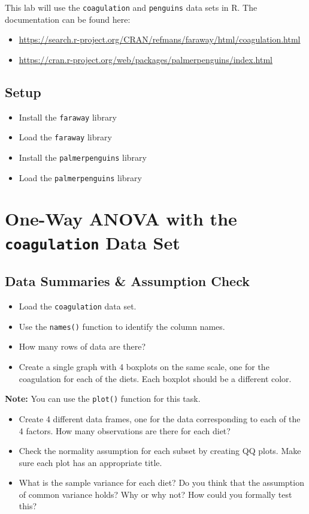 \documentclass{article}
\begin{document}
This lab will use the \texttt{coagulation} and \texttt{penguins} data sets in R. The documentation can be found here:

\begin{itemize}
    \item \url{https://search.r-project.org/CRAN/refmans/faraway/html/coagulation.html}
    \item \url{https://cran.r-project.org/web/packages/palmerpenguins/index.html}
\end{itemize}

\subsection*{Setup}

\begin{itemize}
    \item Install the \texttt{faraway} library
    \item Load the \texttt{faraway} library
    \item Install the \texttt{palmerpenguins} library
    \item Load the \texttt{palmerpenguins} library
\end{itemize}

\section*{One-Way ANOVA with the \texttt{coagulation} Data Set}

\subsection*{Data Summaries \& Assumption Check}

\begin{itemize}
    \item Load the \texttt{coagulation} data set.
    \item Use the \texttt{names()} function to identify the column names.
    \item How many rows of data are there?
    \item Create a single graph with 4 boxplots on the same scale, one for the coagulation for each of the diets. Each boxplot should be a different color.
\end{itemize}

\textbf{Note:} You can use the \texttt{plot()} function for this task.

\begin{itemize}
    \item Create 4 different data frames, one for the data corresponding to each of the 4 factors. How many observations are there for each diet?
    \item Check the normality assumption for each subset by creating QQ plots. Make sure each plot has an appropriate title.
    \item What is the sample variance for each diet? Do you think that the assumption of common variance holds? Why or why not? How could you formally test this?
\end{itemize}
\end{document}
